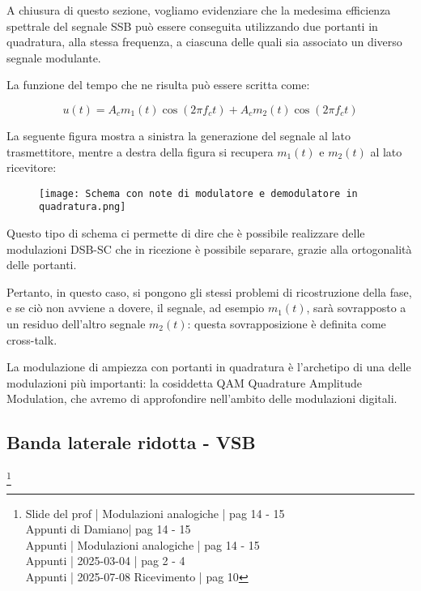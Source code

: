 A chiusura di questo sezione, vogliamo evidenziare che la medesima efficienza spettrale del segnale SSB 
può essere conseguita utilizzando due portanti in quadratura, alla stessa frequenza, 
a ciascuna delle quali sia associato un diverso segnale modulante. \newline 

La funzione del tempo che ne risulta può essere scritta come: 

{
    \Large 
    \begin{equation}
        u (t)
        = 
        A_c m_1 (t) \cos(2 \pi f_c t)
        + 
        A_c m_2 (t) \cos(2 \pi f_c t)
    \end{equation}
}

La seguente figura mostra a sinistra la generazione del segnale al lato trasmettitore, 
mentre a destra della figura si recupera $m_1 (t)$ e $m_2 (t)$ al lato ricevitore: 

\begin{figure}[h]
    \centering
    \texttt{[image: Schema con note di modulatore e demodulatore in quadratura.png]}
\end{figure} 

Questo tipo di schema ci permette di dire che è possibile realizzare delle modulazioni DSB-SC che in ricezione è possibile separare, 
grazie alla ortogonalità delle portanti. \newline 

Pertanto, in questo caso, si pongono gli stessi problemi di ricostruzione della fase, 
e se ciò non avviene a dovere, il segnale, ad esempio $m_1(t)$, 
sarà sovrapposto a un residuo dell'altro segnale $m_2 (t)$: questa sovrapposizione è definita come cross-talk. \newline 

La modulazione di ampiezza con portanti in quadratura è l'archetipo di una delle modulazioni più importanti: 
la cosiddetta QAM Quadrature Amplitude Modulation, che avremo di approfondire nell'ambito delle modulazioni digitali. \newline 

\newpage 

\subsection{Banda laterale ridotta - VSB}
\footnote{Slide del prof | Modulazioni analogiche | pag 14 - 15\\  
Appunti di Damiano| pag 14 - 15\\
Appunti | Modulazioni analogiche | pag 14 - 15\\
Appunti | 2025-03-04 | pag 2 - 4\\ 
Appunti | 2025-07-08 Ricevimento | pag 10
} 

